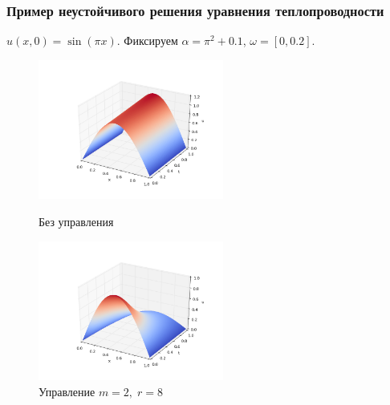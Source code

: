 \documentclass{beamer}
\begin{document}
\begin{frame}
\frametitle{Пример неустойчивого решения уравнения теплопроводности}

$u(x, 0) = \sin{(\pi x)}$. Фиксируем $\alpha = \pi^2 + 0.1$, $\omega = [0, 0.2]$. 


\begin{figure}[H]
\centering
\begin{minipage}{.5\textwidth}
  \centering
  \includegraphics[width=2.4in]{par_ex_pi01}
  \caption{Без управления}
  \label{fig:test1}
\end{minipage}%
\begin{minipage}{.5\textwidth}
  \centering
  \includegraphics[width=2.4in]{par_re_pi01}
  \caption{Управление $m = 2,\; r = 8$}
  \label{fig:test2}
\end{minipage}
\end{figure}

\end{frame}
\end{document}
